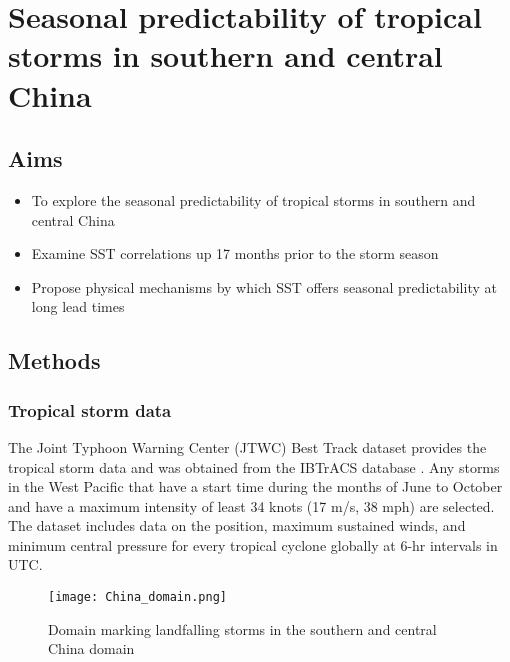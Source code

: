 \graphicspath{{Chapter2/Figs/}}

\chapter{Seasonal predictability of tropical storms in southern and central China}  

\section{Aims}
\begin{itemize}
	\item To explore the seasonal predictability of tropical storms in southern and central China
	\item Examine SST correlations up 17 months prior to the storm season
	\item Propose physical mechanisms by which SST offers seasonal predictability at long lead times

\end{itemize}

\section{Methods}
\subsection{Tropical storm data}

The Joint Typhoon Warning Center (JTWC) Best Track dataset provides the tropical storm data and was obtained from the IBTrACS database \cite{knapp2010international}. Any storms in the West Pacific that have a start time during the months of June to October and have a maximum intensity of least 34 knots (17 m/s, 38 mph) are selected. The dataset includes data on the position, maximum sustained winds, and minimum central pressure for every tropical cyclone globally at 6-hr intervals in UTC.


\begin{figure}[h]
	\centering
	\noindent\texttt{[image: China\_domain.png]}
	\caption{Domain marking landfalling storms in the southern and central China domain}\label{fig:landfall_domain}
\end{figure}

